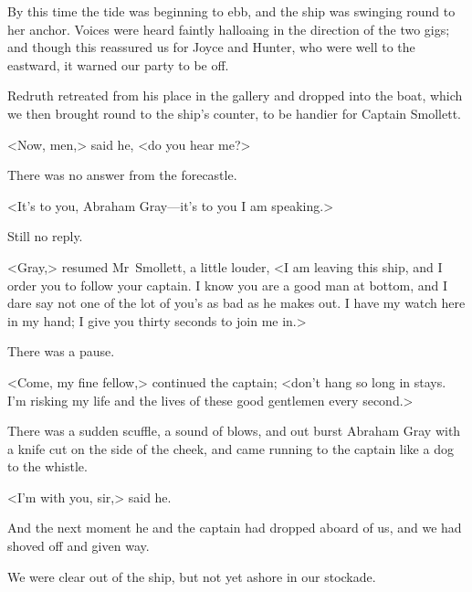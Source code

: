 By this time the tide was beginning to ebb, and the ship was swinging round to her anchor. Voices were heard faintly halloaing in the direction of the two gigs; and though this reassured us for Joyce and Hunter, who were well to the eastward, it warned our party to be off.

Redruth retreated from his place in the gallery and dropped into the boat, which we then brought round to the ship's counter, to be handier for Captain Smollett.

<Now, men,> said he, <do you hear me?>

There was no answer from the forecastle.

<It's to you, Abraham Gray—it's to you I am speaking.>

Still no reply.

<Gray,> resumed Mr~Smollett, a little louder, <I am leaving this ship, and I order you to follow your captain. I know you are a good man at bottom, and I dare say not one of the lot of you's as bad as he makes out. I have my watch here in my hand; I give you thirty seconds to join me in.>

There was a pause.

<Come, my fine fellow,> continued the captain; <don't hang so long in stays. I'm risking my life and the lives of these good gentlemen every second.>

There was a sudden scuffle, a sound of blows, and out burst Abraham Gray with a knife cut on the side of the cheek, and came running to the captain like a dog to the whistle.

<I'm with you, sir,> said he.

And the next moment he and the captain had dropped aboard of us, and we had shoved off and given way.

We were clear out of the ship, but not yet ashore in our stockade.